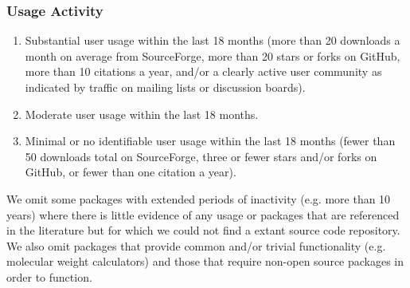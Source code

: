 \subsubsection*{Usage Activity}
\begin{enumerate}
  \item Substantial user usage within the last 18 months (more than 20 downloads a month on average from SourceForge, more than 20 stars or forks on GitHub, more than 10 citations a year, and/or a clearly active user community as indicated by traffic on mailing lists or discussion boards).
  \item Moderate user usage within the last 18 months.
    \item Minimal or no identifiable user usage within the last 18 months (fewer than 50 downloads total on SourceForge, three or fewer stars and/or forks on GitHub, or fewer than one citation a year).
\end{enumerate}

We omit some packages with extended periods of inactivity (e.g. more than 10 years) where there is little evidence of any usage or packages that are referenced in the literature but for which we could not find a extant source code repository.  We also omit packages that provide common and/or trivial functionality (e.g. molecular weight calculators) and those that require non-open source packages in order to function.



 
 

  
  